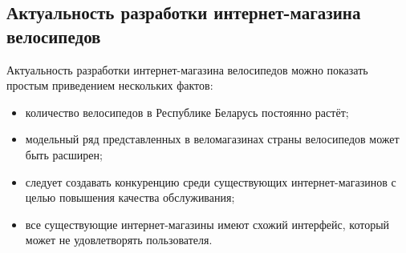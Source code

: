 \subsection{Актуальность разработки интернет-магазина \\ велосипедов}

Актуальность разработки интернет-магазина велосипедов можно показать
простым приведением нескольких фактов: 

\begin{itemize}
  \item количество велосипедов в Республике Беларусь постоянно растёт; 
  \item модельный ряд представленных в веломагазинах страны велосипедов
    может быть расширен;
  \item следует создавать конкуренцию среди существующих интернет-магазинов с
    целью повышения качества обслуживания; 
  \item все существующие интернет-магазины имеют схожий интерфейс, который
    может не удовлетворять пользователя.
\end{itemize}

\pagebreak
